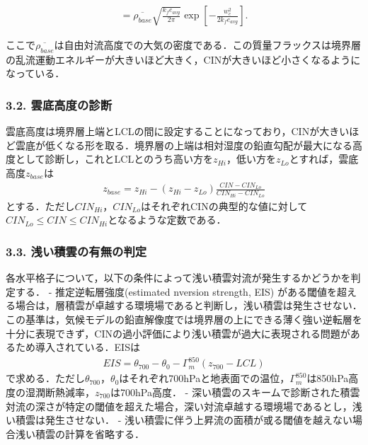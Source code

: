 \begin{eqnarray}=\overline{\rho_{base}}\sqrt{\frac{k_f e_{avg}}{2\pi}}\exp\left[-\frac{w_c^2}{2k_fe_{avg}}\right].\end{eqnarray}

ここで\(\overline{\rho_{base}}\)は自由対流高度での大気の密度である．この質量フラックスは境界層の乱流運動エネルギーが大きいほど大きく，CINが大きいほど小さくなるようになっている．

\hypertarget{ux96f2ux5e95ux9ad8ux5ea6ux306eux8a3aux65ad}{%
\subsubsection{3.2.
雲底高度の診断}\label{ux96f2ux5e95ux9ad8ux5ea6ux306eux8a3aux65ad}}

雲底高度は境界層上端とLCLの間に設定することになっており，CINが大きいほど雲底が低くなる形を取る．境界層の上端は相対湿度の鉛直勾配が最大になる高度として診断し，これとLCLとのうち高い方を\(z_{Hi}\)，低い方を\(z_{Lo}\)とすれば，雲底高度\(z_{base}\)は
\begin{eqnarray}z_{base} = z_{Hi} - (z_{Hi}-z_{Lo})\frac{CIN-CIN_{Lo}}{CIN_{Hi} - CIN_{Lo}}\end{eqnarray}
とする．ただし\(CIN_{Hi}\)，\(CIN_{Lo}\)はそれぞれCINの典型的な値に対して\(CIN_{Lo}\le CIN \le CIN_{Hi}\)となるような定数である．

\hypertarget{ux6d45ux3044ux7a4dux96f2ux306eux6709ux7121ux306eux5224ux5b9a}{%
\subsubsection{\texorpdfstring{3.3.
浅い積雲の有無の判定}{3.3.  浅い積雲の有無の判定}}\label{ux6d45ux3044ux7a4dux96f2ux306eux6709ux7121ux306eux5224ux5b9a}}

各水平格子について，以下の条件によって浅い積雲対流が発生するかどうかを判定する．
- 推定逆転層強度(estimated nversion strength, EIS)
がある閾値を超える場合は，層積雲が卓越する環境場であると判断し，浅い積雲は発生させない．この基準は，気候モデルの鉛直解像度では境界層の上にできる薄く強い逆転層を十分に表現できず，CINの過小評価により浅い積雲が過大に表現される問題があるため導入されている．EISは
\begin{eqnarray}EIS=\theta_{700}-\theta_{0}-\Gamma_m^{850}(z_{700}-LCL)\end{eqnarray}
で求める．ただし\(\theta_{700}\)，\(\theta_0\)はそれぞれ700hPaと地表面での温位，\(\Gamma_m^{850}\)は850hPa高度の湿潤断熱減率，\(z_{700}\)は700hPa高度．
-
深い積雲のスキームで診断された積雲対流の深さが特定の閾値を超えた場合，深い対流卓越する環境場であるとし，浅い積雲は発生させない．
-
浅い積雲に伴う上昇流の面積が或る閾値を越えない場合浅い積雲の計算を省略する．

